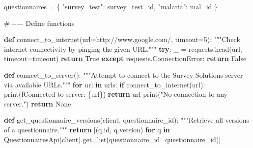 \documentclass[
  letterpaper,
  DIV=11,
  numbers=noendperiod]{scrreprt}
\newenvironment{Shaded}{\begin{snugshade}}{\end{snugshade}}
\newcommand{\BuiltInTok}[1]{\textcolor[rgb]{0.00,0.23,0.31}{#1}}
\newcommand{\CommentTok}[1]{\textcolor[rgb]{0.37,0.37,0.37}{#1}}
\newcommand{\ControlFlowTok}[1]{\textcolor[rgb]{0.00,0.23,0.31}{\textbf{#1}}}
\newcommand{\DecValTok}[1]{\textcolor[rgb]{0.68,0.00,0.00}{#1}}
\newcommand{\KeywordTok}[1]{\textcolor[rgb]{0.00,0.23,0.31}{\textbf{#1}}}
\newcommand{\NormalTok}[1]{\textcolor[rgb]{0.00,0.23,0.31}{#1}}
\newcommand{\OperatorTok}[1]{\textcolor[rgb]{0.37,0.37,0.37}{#1}}
\newcommand{\PreprocessorTok}[1]{\textcolor[rgb]{0.68,0.00,0.00}{#1}}
\newcommand{\SpecialCharTok}[1]{\textcolor[rgb]{0.37,0.37,0.37}{#1}}
\newcommand{\SpecialStringTok}[1]{\textcolor[rgb]{0.13,0.47,0.30}{#1}}
\newcommand{\StringTok}[1]{\textcolor[rgb]{0.13,0.47,0.30}{#1}}
\newcommand{\VariableTok}[1]{\textcolor[rgb]{0.07,0.07,0.07}{#1}}
\begin{document}
\begin{Shaded}
\begin{Highlighting}[]
\NormalTok{questionnaires }\OperatorTok{=}\NormalTok{ \{}
    \StringTok{"survey\_test"}\NormalTok{: survey\_test\_id,}
    \StringTok{"malaria"}\NormalTok{: mal\_id}
\NormalTok{\}}


\CommentTok{\# {-}{-}{-}{-}{-} Define functions}

\KeywordTok{def}\NormalTok{ connect\_to\_internet(url}\OperatorTok{=}\StringTok{\textquotesingle{}http://www.google.com/\textquotesingle{}}\NormalTok{, timeout}\OperatorTok{=}\DecValTok{5}\NormalTok{):}
    \CommentTok{"""Check internet connectivity by pinging the given URL."""}
    \ControlFlowTok{try}\NormalTok{:}
\NormalTok{        \_ }\OperatorTok{=}\NormalTok{ requests.head(url, timeout}\OperatorTok{=}\NormalTok{timeout)}
        \ControlFlowTok{return} \VariableTok{True}
    \ControlFlowTok{except}\NormalTok{ requests.}\PreprocessorTok{ConnectionError}\NormalTok{:}
        \ControlFlowTok{return} \VariableTok{False}


\KeywordTok{def}\NormalTok{ connect\_to\_server():}
    \CommentTok{"""Attempt to connect to the Survey Solutions server via available URLs."""}
    \ControlFlowTok{for}\NormalTok{ url }\KeywordTok{in}\NormalTok{ urls:}
        \ControlFlowTok{if}\NormalTok{ connect\_to\_internet(url):}
            \BuiltInTok{print}\NormalTok{(}\SpecialStringTok{f\textquotesingle{}Connected to server: }\SpecialCharTok{\{}\NormalTok{url}\SpecialCharTok{\}}\SpecialStringTok{\textquotesingle{}}\NormalTok{)}
            \ControlFlowTok{return}\NormalTok{ url}
    \BuiltInTok{print}\NormalTok{(}\StringTok{"No connection to any server."}\NormalTok{)}
    \ControlFlowTok{return} \VariableTok{None}


\KeywordTok{def}\NormalTok{ get\_questionnaire\_versions(client, questionnaire\_id):}
    \CommentTok{"""Retrieve all versions of a questionnaire."""}
    \ControlFlowTok{return}\NormalTok{ [(q.}\BuiltInTok{id}\NormalTok{, q.version) }\ControlFlowTok{for}\NormalTok{ q }\KeywordTok{in}\NormalTok{ QuestionnairesApi(client).get\_list(questionnaire\_id}\OperatorTok{=}\NormalTok{questionnaire\_id)]}



\end{Highlighting}
\end{Shaded}
\end{document}
